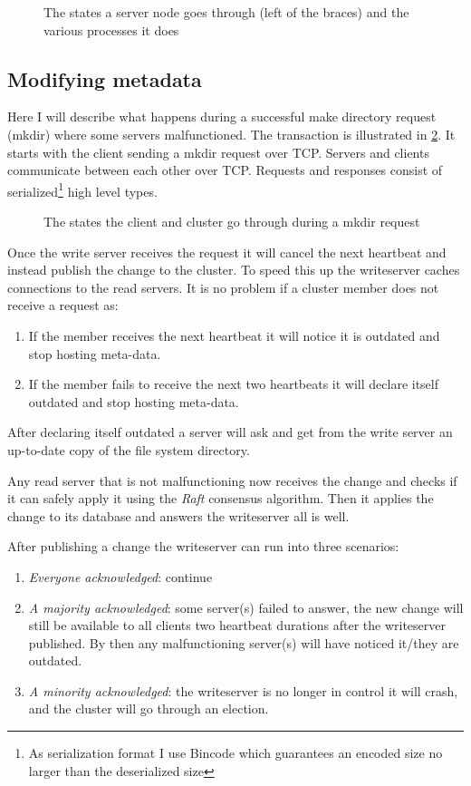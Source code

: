\begin{figure}[htbp]
	\centering
	
	\caption{The states a server node goes through (left of the braces) and the various processes it does}
	\label{fig:nodelife}
\end{figure}

\subsection{Modifying metadata}
Here I will describe what happens during a successful make directory request (mkdir) where some servers malfunctioned. The transaction is illustrated in \cref{fig:mkdir}. It starts with the client sending a mkdir request over TCP. Servers and clients communicate between each other over TCP. Requests and responses consist of serialized\footnote{As serialization format I use Bincode which guarantees an encoded size no larger than the deserialized size} high level types. 

\begin{figure}[htbp]
	\centering
	
	\caption{The states the client and cluster go through during a mkdir request}
	\label{fig:mkdir}
\end{figure}

Once the write server receives the request it will cancel the next heartbeat and instead publish the change to the cluster. To speed this up the writeserver caches connections to the read servers. It is no problem if a cluster member does not receive a request as:
\begin{enumerate}
	\item If the member receives the next heartbeat it will notice it is outdated and stop hosting meta-data. 
	\item If the member fails to receive the next two heartbeats it will declare itself outdated and stop hosting meta-data.
\end{enumerate}
After declaring itself outdated a server will ask and get from the write server an up-to-date copy of the file system directory. 

Any read server that is not malfunctioning now receives the change and checks if it can safely apply it using the \textit{Raft} consensus algorithm. Then it applies the change to its database and answers the writeserver all is well.

After publishing a change the writeserver can run into three scenarios:
\begin{enumerate}
	\item \textit{Everyone acknowledged}: continue
	\item \textit{A majority acknowledged}: some server(s) failed to answer, the new change will still be available to all clients two heartbeat durations after the writeserver published. By then any malfunctioning server(s) will have noticed it/they are outdated.
	\item \textit{A minority acknowledged}: the writeserver is no longer in control it will crash, and the cluster will go through an election.
\end{enumerate}

